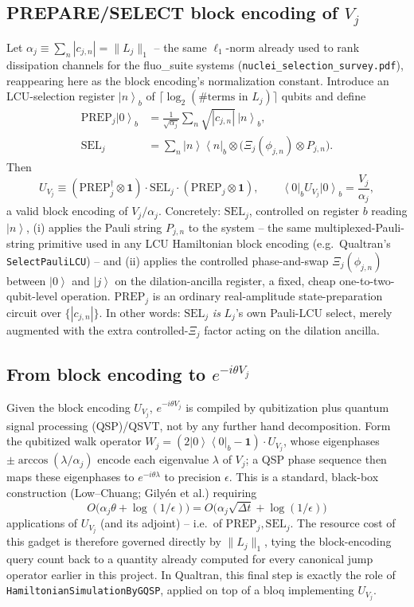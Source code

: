 \documentclass[11pt]{article}
\newcommand{\Dt}{\Delta t}
\renewcommand{\ket}[1]{\left| #1 \right\rangle}
\renewcommand{\bra}[1]{\left\langle #1 \right|}
\newcommand{\Prep}{\mathrm{PREP}}
\newcommand{\Sel}{\mathrm{SEL}}
\begin{document}
\subsection{PREPARE/SELECT block encoding of \texorpdfstring{$V_j$}{Vj}}
Let $\alpha_j\equiv\sum_n|c_{j,n}|=\|L_j\|_1$ -- the same $\ell_1$-norm already used to rank dissipation channels for the fluo\_suite systems (\texttt{nuclei\_selection\_survey.pdf}), reappearing here as the block encoding's normalization constant. Introduce an LCU-selection register $\ket{n}_b$ of $\lceil\log_2(\#\text{terms in }L_j)\rceil$ qubits and define
\begin{align}
    \Prep_j\ket0_b &= \frac{1}{\sqrt{\alpha_j}}\sum_n\sqrt{|c_{j,n}|}\,\ket n_b,\\
    \Sel_j &= \sum_n\ket n\bra n_b\otimes\Big(\Xi_j(\phi_{j,n})\otimes P_{j,n}\Big).
\end{align}
Then
\begin{equation}
    U_{V_j} \equiv (\Prep_j^\dagger\otimes\mathbf1)\cdot\Sel_j\cdot(\Prep_j\otimes\mathbf1),\qquad
    \bra0_bU_{V_j}\ket0_b = \frac{V_j}{\alpha_j},
\end{equation}
a valid block encoding of $V_j/\alpha_j$. Concretely: $\Sel_j$, controlled on register $b$ reading $\ket n$, (i) applies the Pauli string $P_{j,n}$ to the system -- the same multiplexed-Pauli-string primitive used in any LCU Hamiltonian block encoding (e.g.\ Qualtran's \texttt{SelectPauliLCU}) -- and (ii) applies the controlled phase-and-swap $\Xi_j(\phi_{j,n})$ between $\ket0$ and $\ket j$ on the dilation-ancilla register, a fixed, cheap one-to-two-qubit-level operation. $\Prep_j$ is an ordinary real-amplitude state-preparation circuit over $\{|c_{j,n}|\}$. In other words: $\Sel_j$ \emph{is} $L_j$'s own Pauli-LCU select, merely augmented with the extra controlled-$\Xi_j$ factor acting on the dilation ancilla.

\subsection{From block encoding to \texorpdfstring{$e^{-i\theta V_j}$}{e\^{}(-i theta Vj)}}
Given the block encoding $U_{V_j}$, $e^{-i\theta V_j}$ is compiled by qubitization plus quantum signal processing (QSP)/QSVT, not by any further hand decomposition. Form the qubitized walk operator $W_j=(2\ket0\bra0_b-\mathbf1)\cdot U_{V_j}$, whose eigenphases $\pm\arccos(\lambda/\alpha_j)$ encode each eigenvalue $\lambda$ of $V_j$; a QSP phase sequence then maps these eigenphases to $e^{-i\theta\lambda}$ to precision $\epsilon$. This is a standard, black-box construction (Low--Chuang; Gily\'en et al.) requiring
\begin{equation}
    O\big(\alpha_j\theta+\log(1/\epsilon)\big) = O\big(\alpha_j\sqrt{\Dt}+\log(1/\epsilon)\big)
\end{equation}
applications of $U_{V_j}$ (and its adjoint) -- i.e.\ of $\Prep_j,\Sel_j$. The resource cost of this gadget is therefore governed directly by $\|L_j\|_1$, tying the block-encoding query count back to a quantity already computed for every canonical jump operator earlier in this project. In Qualtran, this final step is exactly the role of \texttt{HamiltonianSimulationByGQSP}, applied on top of a bloq implementing $U_{V_j}$.
\end{document}
